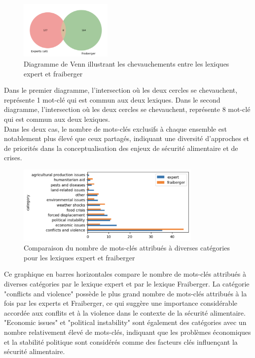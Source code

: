 \documentclass{article}
\begin{document}
\begin{figure}[h]
    \centering
    \includegraphics[width=0.4\textwidth]{expertFraiberger.png}
    \caption{Diagramme de Venn illustrant les chevauchements entre les lexiques expert et fraiberger}
    \label{fig:expert_fraiberger}
\end{figure}
\vspace{2cm}
Dans le premier diagramme, l'intersection où les deux cercles se chevauchent, représente 1 mot-clé qui est commun aux deux lexiques. Dans le second diagramme, l'intersection où les deux cercles se chevauchent, représente 8 mot-clé qui est commun aux deux lexiques. \\

Dans les deux cas, le nombre de mots-clés exclusifs à chaque ensemble est notablement plus élevé que ceux partagés, indiquant une diversité d'approches et de priorités dans la conceptualisation des enjeux de sécurité alimentaire et de crises.
\vspace{0.5cm}

\begin{figure}[h]
    \centering
    \includegraphics[width=0.8\textwidth]{freqCat.png}
    \caption{Comparaison du nombre de mots-clés attribués à diverses catégories pour les lexiques expert et fraiberger}
    \label{fig:freq_cat}
\end{figure}
\vspace{0.5cm}

Ce graphique en barres horizontales compare le nombre de mots-clés attribués à diverses catégories par le lexique expert et par le lexique Fraiberger. La catégorie "conflicts and violence" possède le plus grand nombre de mots-clés attribués à la fois par les experts et Fraiberger, ce qui suggère une importance considérable accordée aux conflits et à la violence dans le contexte de la sécurité alimentaire. "Economic issues" et "political instability" sont également des catégories avec un nombre relativement élevé de mots-clés, indiquant que les problèmes économiques et la stabilité politique sont considérés comme des facteurs clés influençant la sécurité alimentaire.
\end{document}
